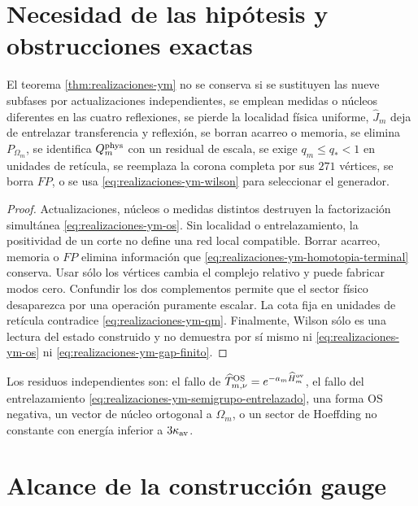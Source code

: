 \section*{Necesidad de las hipótesis y obstrucciones exactas}

\begin{ablation}
\label{abl:realizaciones-ym}
El teorema \ref{thm:realizaciones-ym} no se conserva si se sustituyen las
nueve subfases por actualizaciones independientes, se emplean medidas o
núcleos diferentes en las cuatro reflexiones, se pierde la localidad física
uniforme, \(\widehat J_m\) deja de entrelazar transferencia y reflexión, se
borran acarreo o memoria, se elimina \(P_{\Omega_m}\), se identifica
\(Q_m^{\rm phys}\) con un residual de escala, se exige
\(q_m\leq q_*<1\) en unidades de retícula, se reemplaza la corona completa
por sus \(271\) vértices, se borra \(FP\), o se usa
\eqref{eq:realizaciones-ym-wilson} para seleccionar el generador.
\end{ablation}

\begin{proof}
Actualizaciones, núcleos o medidas distintos destruyen la factorización
simultánea \eqref{eq:realizaciones-ym-os}. Sin localidad o entrelazamiento,
la positividad de un corte no define una red local compatible. Borrar acarreo,
memoria o \(FP\) elimina información que
\eqref{eq:realizaciones-ym-homotopia-terminal} conserva. Usar sólo los
vértices cambia el complejo relativo y puede fabricar modos cero. Confundir
los dos complementos permite que el sector físico desaparezca por una
operación puramente escalar. La cota fija en unidades de retícula contradice
\eqref{eq:realizaciones-ym-qm}. Finalmente, Wilson sólo es una lectura del
estado construido y no demuestra por sí mismo ni
\eqref{eq:realizaciones-ym-os} ni
\eqref{eq:realizaciones-ym-gap-finito}.
\end{proof}

Los residuos independientes son: el fallo de
\(\widehat T_{m,\nu}^{\rm OS}=e^{-a_m\widehat H_m^{\rm ov}}\), el fallo del
entrelazamiento \eqref{eq:realizaciones-ym-semigrupo-entrelazado}, una forma
OS negativa, un vector de núcleo ortogonal a \(\Omega_m\), o un sector de
Hoeffding no constante con energía inferior a \(3\kappa_{\rm av}\).

\section*{Alcance de la construcción gauge}

